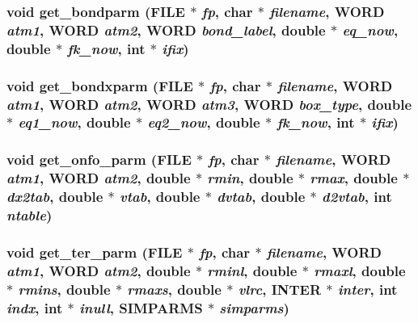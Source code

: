 \subsubsection{\setlength{\rightskip}{0pt plus 5cm}void get\_\-bondparm (FILE $\ast$ {\em fp}, char $\ast$ {\em filename}, {\bf WORD} {\em atm1}, {\bf WORD} {\em atm2}, {\bf WORD} {\em bond\_\-label}, double $\ast$ {\em eq\_\-now}, double $\ast$ {\em fk\_\-now}, int $\ast$ {\em ifix})}\label{thomas_2md__getparm_8c_dbcf9f37fe1a551e856ce7f61694d37c}


\subsubsection{\setlength{\rightskip}{0pt plus 5cm}void get\_\-bondxparm (FILE $\ast$ {\em fp}, char $\ast$ {\em filename}, {\bf WORD} {\em atm1}, {\bf WORD} {\em atm2}, {\bf WORD} {\em atm3}, {\bf WORD} {\em box\_\-type}, double $\ast$ {\em eq1\_\-now}, double $\ast$ {\em eq2\_\-now}, double $\ast$ {\em fk\_\-now}, int $\ast$ {\em ifix})}\label{thomas_2md__getparm_8c_3b6220a5e830a4771e1424f94441f66e}


\subsubsection{\setlength{\rightskip}{0pt plus 5cm}void get\_\-onfo\_\-parm (FILE $\ast$ {\em fp}, char $\ast$ {\em filename}, {\bf WORD} {\em atm1}, {\bf WORD} {\em atm2}, double $\ast$ {\em rmin}, double $\ast$ {\em rmax}, double $\ast$ {\em dx2tab}, double $\ast$ {\em vtab}, double $\ast$ {\em dvtab}, double $\ast$ {\em d2vtab}, int {\em ntable})}\label{thomas_2md__getparm_8c_5a05c8e90ce64ecb7134feba37375279}


\subsubsection{\setlength{\rightskip}{0pt plus 5cm}void get\_\-ter\_\-parm (FILE $\ast$ {\em fp}, char $\ast$ {\em filename}, {\bf WORD} {\em atm1}, {\bf WORD} {\em atm2}, double $\ast$ {\em rminl}, double $\ast$ {\em rmaxl}, double $\ast$ {\em rmins}, double $\ast$ {\em rmaxs}, double $\ast$ {\em vlrc}, {\bf INTER} $\ast$ {\em inter}, int {\em indx}, int $\ast$ {\em inull}, {\bf SIMPARMS} $\ast$ {\em simparms})}\label{thomas_2md__getparm_8c_77b9e6ee47101c89811eb3c725883a8e}


